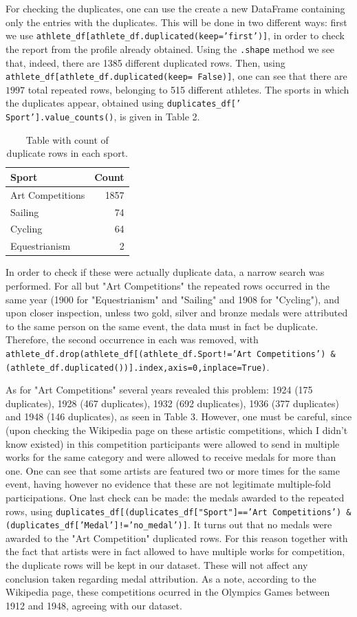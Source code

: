 \documentclass[11pt]{article} %
\begin{document}
For checking the duplicates, one can use the create a new DataFrame containing only the entries with the duplicates. This will be done in two different ways: first we use {\tt athlete\_df[athlete\_df.duplicated(keep='first')]}, in order to check the report from the profile already obtained. Using the {\tt .shape} method we see that, indeed, there are 1385 different duplicated rows. Then, using {\tt athlete\_df[athlete\_df.duplicated(keep= False)]}, one can see that there are $1997$ total repeated rows, belonging to 515 different athletes. The sports in which the duplicates appear, obtained using {\tt duplicates\_df[' Sport'].value\_counts()}, is given in Table 2.

\begin{table}
\centering
\begin{tabular}{lr}
\toprule
Sport & Count  \\
\midrule
Art Competitions &   1857 \\
Sailing          &     74 \\
Cycling          &     64 \\
Equestrianism    &      2 \\
\bottomrule
\end{tabular}
\caption{Table with count of duplicate rows in each sport.}
\end{table}

In order to check if these were actually duplicate data, a narrow search was performed. For all but "Art Competitions" the repeated rows occurred in the same year (1900 for "Equestrianism" and "Sailing" and 1908 for "Cycling"), and upon closer inspection, unless two gold, silver and bronze medals were attributed to the same person on the same event, the data must in fact be duplicate. Therefore, the second occurrence in each was removed, with {\tt athlete\_df.drop(athlete\_df[(athlete\_df.Sport!='Art Competitions') \& (athlete\_df.duplicated())].index,axis=0,inplace=True)}.  

As for "Art Competitions" several years revealed this problem: 1924 (175 duplicates), 1928 (467 duplicates), 1932 (692 duplicates), 1936 (377 duplicates) and 1948 (146 duplicates), as seen in Table 3. However, one must be careful, since (upon checking the Wikipedia page on these artistic competitions, which I didn't know existed) in this competition participants were allowed to send in multiple works for the same category and were allowed to receive medals for more than one. One can see that some artists are featured two or more times for the same event, having however no evidence that these are not legitimate multiple-fold participations. One last check can be made: the medals awarded to the repeated rows, using {\tt duplicates\_df[(duplicates\_df["Sport"]=='Art Competitions')  \& (duplicates\_df['Medal']!='no\_medal')]}. It turns out that no medals were awarded to the "Art Competition" duplicated rows. For this reason together with the fact that artists were in fact allowed to have multiple works for competition, the duplicate rows will be kept in our dataset. These will not affect any conclusion taken regarding medal attribution. As a note, according to the Wikipedia page, these competitions ocurred in the Olympics Games between 1912 and 1948, agreeing with our dataset.
\end{document}
